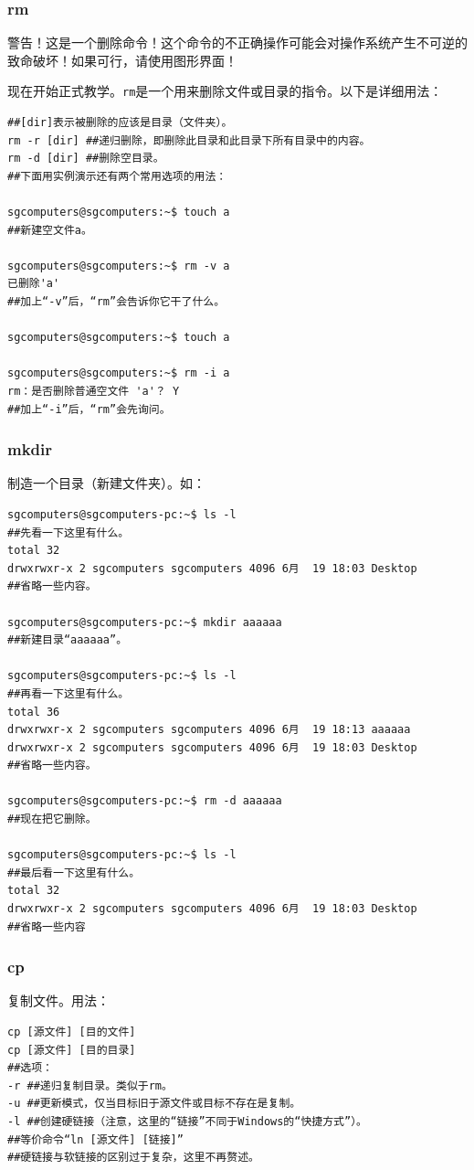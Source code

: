 \subsubsection{rm}
{\color{red}警告！这是一个删除命令！这个命令的不正确操作可能会对操作系统产生不可逆的致命破坏！如果可行，请使用图形界面！}\par
\cite{manrm} 现在开始正式教学。\verb|rm|是一个用来删除文件或目录的指令。以下是详细用法：
\begin{verbatim}
##[dir]表示被删除的应该是目录（文件夹）。
rm -r [dir] ##递归删除，即删除此目录和此目录下所有目录中的内容。
rm -d [dir] ##删除空目录。
##下面用实例演示还有两个常用选项的用法：

sgcomputers@sgcomputers:~$ touch a
##新建空文件a。

sgcomputers@sgcomputers:~$ rm -v a
已删除'a'
##加上“-v”后，“rm”会告诉你它干了什么。

sgcomputers@sgcomputers:~$ touch a

sgcomputers@sgcomputers:~$ rm -i a
rm：是否删除普通空文件 'a'？ Y
##加上“-i”后，“rm”会先询问。

\end{verbatim}
\subsubsection{mkdir}
制造一个目录（新建文件夹）。如：
\begin{verbatim}
sgcomputers@sgcomputers-pc:~$ ls -l
##先看一下这里有什么。
total 32
drwxrwxr-x 2 sgcomputers sgcomputers 4096 6月  19 18:03 Desktop
##省略一些内容。

sgcomputers@sgcomputers-pc:~$ mkdir aaaaaa
##新建目录“aaaaaa”。

sgcomputers@sgcomputers-pc:~$ ls -l
##再看一下这里有什么。
total 36
drwxrwxr-x 2 sgcomputers sgcomputers 4096 6月  19 18:13 aaaaaa
drwxrwxr-x 2 sgcomputers sgcomputers 4096 6月  19 18:03 Desktop
##省略一些内容。

sgcomputers@sgcomputers-pc:~$ rm -d aaaaaa
##现在把它删除。

sgcomputers@sgcomputers-pc:~$ ls -l
##最后看一下这里有什么。
total 32
drwxrwxr-x 2 sgcomputers sgcomputers 4096 6月  19 18:03 Desktop
##省略一些内容
\end{verbatim}
\subsubsection{cp}
复制文件。用法：
\begin{verbatim}
cp [源文件] [目的文件]
cp [源文件] [目的目录]
##选项：
-r ##递归复制目录。类似于rm。
-u ##更新模式，仅当目标旧于源文件或目标不存在是复制。
-l ##创建硬链接（注意，这里的“链接”不同于Windows的“快捷方式”）。
##等价命令“ln [源文件] [链接]”
##硬链接与软链接的区别过于复杂，这里不再赘述。
\end{verbatim}
